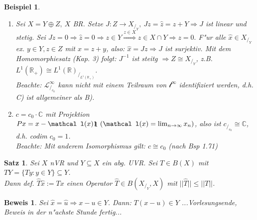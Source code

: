 \documentclass[a4paper,11pt]{book}
\newcommand{\R}{{\mathbb R}}
\newcommand{\C}{{\mathbb C}}
\newcommand{\ssL}{{\mathcal L}}
\newcommand{\ssl}{{\mathcal l}}
\newcommand{\id}{1\hspace{-0,9ex}\raisebox{-0,2ex}{1}}
\newtheorem{Sa}[Def]{Satz}
\newtheorem{Bsp}[Def]{Beispiel}
\theoremstyle{nonumberplain}
\newtheorem{Bew}[Def]{Beweis}
\begin{document}
\begin{Bsp}
\begin{enumerate}
\item[a)] Sei $X = Y \oplus Z,\ X$ BR. Setze $J: Z \rightarrow X_{/_Y},\ Jz = \hat{z} = z+Y \Rightarrow J$ ist linear und stetig. Sei $Jz = 0 \Rightarrow \hat{z} = 0 \Rightarrow z \in Y \stackrel{z \in X}{\Rightarrow} z \in X \cap Y \Rightarrow z = 0.$ F"ur alle $\hat{x} \in X_{/_Y}$ ex. $y \in Y, z \in Z$ mit $x = z+y$, also: $\hat{x} = Jz \Rightarrow J$ ist surjektiv. Mit dem Homomorphiesatz (Kap. 3) folgt: $J^{-1}$ ist steitg $\Rightarrow Z \cong X_{/_Y}$, z.B. $L^1(\R_+) \cong L^1(\R)_{/_{L^1(\R_+)}}$.\\
Beachte: $\ssL_{/_{c_0}}^{\infty}$ kann nicht mit einem Teilraum von $\ssl^{\infty}$ identifiziert werden, d.h. C) ist allgemeiner als B).

\item[b)] $c = c_0 \cdot \C$ mit Projektion $Px = x - \ssl(x) \id \ (\ssl(x)=\lim_{n \rightarrow \infty} x_n)$, also ist $c_{/_{c_0}} \cong \C$, d.h. codim $c_0 = 1$.\\
Beachte: Mit anderem Isomorphismus gilt: $c \cong c_0$ (nach Bsp 1.71)
\end{enumerate}
\end{Bsp}

\begin{Sa}
Sei $X$ nVR und $Y \subseteq X$ ein abg. UVR. Sei $T \in B(X)$ mit $TY = \{ Ty: y \in Y \} \subseteq Y$.\\
Dann def. $\hat{T} \hat{x} := Tx$ einen Operator $\hat{T} \in B(X_{/_Y},X)$ mit $||\hat{T}|| \leq ||T||$.
\end{Sa}

\begin{Bew}
Sei $\hat{x} = \hat{u} \Rightarrow x-u \in Y$. Dann: $T(x-u) \in Y$
...Vorlesungsende, Beweis in der n"achste Stunde fertig...
\end{Bew}
\end{document}
